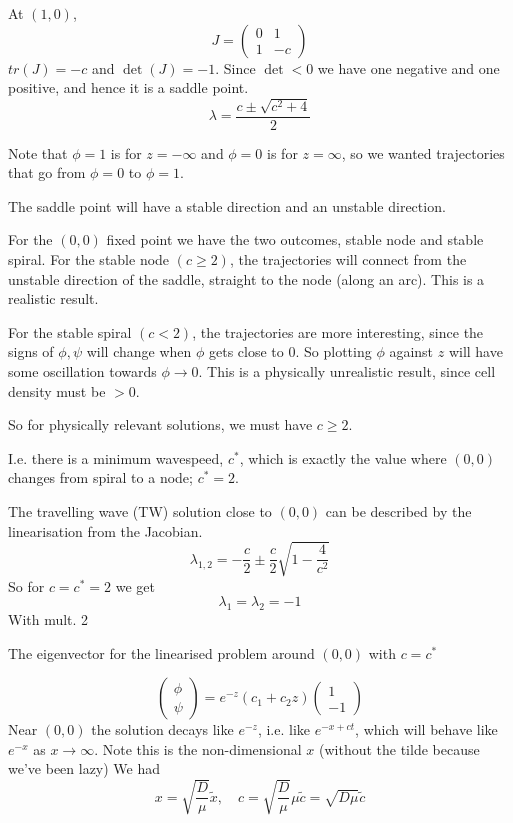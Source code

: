 \documentclass{X:/Documents/Coding/Latex/myassignment}
\begin{document}
At $(1,0)$,
\[J = \begin{pmatrix}
	0&1\\1&-c
\end{pmatrix}\]
 $tr(J) = -c$ and $\det(J) = -1$. Since $\det < 0$ we have one negative and one positive, and hence it is a saddle point.
 \[\lambda = \frac{c\pm \sqrt{c^2 + 4}}{2}\]


Note that $\phi = 1$ is for $z = -\infty$ and $\phi = 0$ is for $z=\infty$, so we wanted trajectories that go from $\phi=0$ to $\phi=1$.

The saddle point will have a stable direction and an unstable direction.

For the $(0,0)$ fixed point we have the two outcomes, stable node and stable spiral.
For the stable node $(c \geq 2)$, the trajectories will connect from the unstable direction of the saddle, straight to the node (along an arc). This is a realistic result.

For the stable spiral $(c < 2)$, the trajectories are more interesting, since the signs of $\phi,\psi$ will change when $\phi$ gets close to $0$. So plotting $\phi$ against $z$ will have some oscillation towards $\phi \to 0$. This is a physically unrealistic result, since cell density must be $> 0$.

So for physically relevant solutions, we must have $c\geq 2$.

I.e. there is a minimum wavespeed, $c^*$, which is exactly the value where $(0,0)$ changes from spiral to a node; $c^* = 2$.

The travelling wave (TW) solution close to $(0,0)$ can be described by the linearisation from the Jacobian.
\[\lambda_{1,2} = -\frac{c}{2} \pm \frac{c}{2} \sqrt{1 - \frac{4}{c^2}}\]
So for $c = c^* = 2$ we get
\[\lambda_1 = \lambda_2 =-1\]
With mult. 2

The eigenvector for the linearised problem around $(0,0)$ with $c = c^*$

\[\begin{pmatrix}
	\phi\\
	\psi
\end{pmatrix} = e^{-z} (c_1 + c_2 z) \begin{pmatrix}
	1\\-1
\end{pmatrix}\]
Near $(0,0)$ the solution decays like $e^{-z}$, i.e. like $e^{-x+ct}$, which will behave like $e^{-x}$ as $x\to\infty$. Note this is the non-dimensional $x$ (without the tilde because we've been lazy)
We had 
\[x = \sqrt{\frac{D}{\mu}} \tilde{x}, \quad c = \sqrt{\frac{D}{\mu}}\mu \tilde{c} = \sqrt{D\mu} \tilde{c}\]
\end{document}
